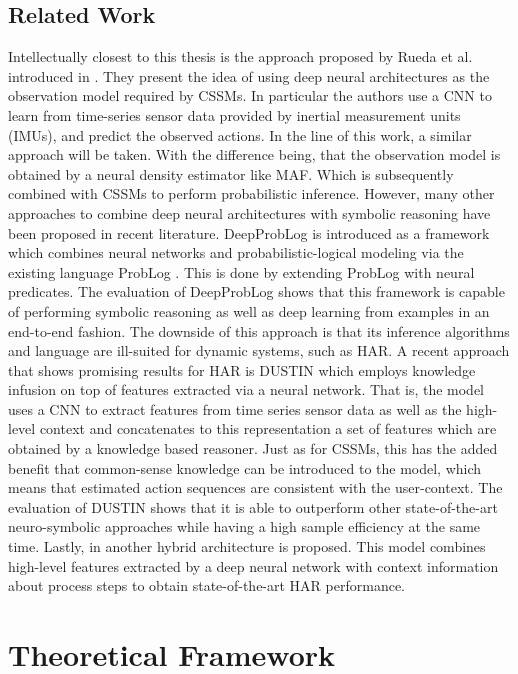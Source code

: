 \documentclass[11pt,titlepage,oneside,openany]{book}
\begin{document}
\section{Related Work}
 Intellectually closest to this thesis is the approach proposed by Rueda et al. introduced in \cite{rueda_combining_2019}. They present the idea of using deep neural architectures as the observation model required by CSSMs. In particular the authors use a CNN to learn from time-series sensor data provided by inertial measurement units (IMUs), and predict the observed actions. In the line of this work, a similar approach will be taken. With the difference being, that the observation model is obtained by a neural density estimator like MAF. Which is subsequently combined with CSSMs to perform probabilistic inference. However, many other approaches to combine deep neural architectures with symbolic reasoning have been proposed in recent literature. DeepProbLog \cite{manhaeve_deepproblog_2018} is introduced as a framework which combines neural networks and probabilistic-logical modeling via the existing language ProbLog \cite{raedt_problog_nodate}. This is done by extending ProbLog with neural predicates. The evaluation of DeepProbLog shows that this framework is capable of performing symbolic reasoning as well as deep learning from examples in an end-to-end fashion. The downside of this approach is that its inference algorithms and language are ill-suited for dynamic systems, such as HAR. A recent approach that shows promising results for HAR is DUSTIN \cite{arrotta_knowledge_2022} which employs knowledge infusion on top of features extracted via a neural network. That is, the model uses a CNN to extract features from time series sensor data as well as the high-level context and concatenates to this representation a set of features which are obtained by a knowledge based reasoner. Just as for CSSMs, this has the added benefit that common-sense knowledge can be introduced to the model, which means that estimated action sequences are consistent with the user-context. The evaluation of DUSTIN shows that it is able to outperform other state-of-the-art neuro-symbolic approaches while having a high sample efficiency at the same time. Lastly, in \cite{ludtke_human_2021} another hybrid architecture is proposed. This model combines high-level features extracted by a deep neural network with context information about process steps to obtain state-of-the-art HAR performance.


\chapter{Theoretical Framework}
\label{cha:theory}
\end{document}
